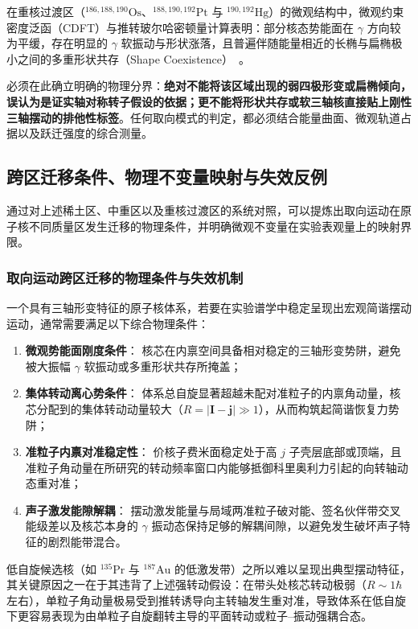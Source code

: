 在重核过渡区（$^{186,188,190}\mathrm{Os}$、$^{188,190,192}\mathrm{Pt}$ 与 $^{190,192}\mathrm{Hg}$）的微观结构中，微观约束密度泛函（CDFT）与推转玻尔哈密顿量计算表明：部分核态势能面在 $\gamma$ 方向较为平缓，存在明显的 $\gamma$ 软振动与形状涨落，且普遍伴随能量相近的长椭与扁椭极小之间的多重形状共存（Shape Coexistence）~\cite{prochniak-rohozinski-2009-bohr-collective-hamiltonian}。

必须在此确立明确的物理分界：\textbf{绝对不能将该区域出现的弱四极形变或扁椭倾向，误认为是证实轴对称转子假设的依据；更不能将形状共存或软三轴核直接贴上刚性三轴摆动的排他性标签}。任何取向模式的判定，都必须结合能量曲面、微观轨道占据以及跃迁强度的综合测量。

\subsection{跨区迁移条件、物理不变量映射与失效反例}\label{sec:4-4-5}

通过对上述稀土区、中重区以及重核过渡区的系统对照，可以提炼出取向运动在原子核不同质量区发生迁移的物理条件，并明确微观不变量在实验表观量上的映射界限。

\subsubsection{取向运动跨区迁移的物理条件与失效机制}

一个具有三轴形变特征的原子核体系，若要在实验谱学中稳定呈现出宏观简谐摆动运动，通常需要满足以下综合物理条件：
\begin{enumerate}
\item \textbf{微观势能面刚度条件}：
核芯在内禀空间具备相对稳定的三轴形变势阱，避免被大振幅 $\gamma$ 软振动或多重形状共存所掩盖；
\item \textbf{集体转动离心势条件}：
体系总自旋显著超越未配对准粒子的内禀角动量，核芯分配到的集体转动动量较大（$R = |\mathbf{I} - \mathbf{j}| \gg 1$），从而构筑起简谐恢复力势阱；
\item \textbf{准粒子内禀对准稳定性}：
价核子费米面稳定处于高 $j$ 子壳层底部或顶端，且准粒子角动量在所研究的转动频率窗口内能够抵御科里奥利力引起的向转轴动态重对准；
\item \textbf{声子激发能隙解耦}：
摆动激发能量与局域两准粒子破对能、签名伙伴带交叉能级差以及核芯本身的 $\gamma$ 振动态保持足够的解耦间隙，以避免发生破坏声子特征的剧烈能带混合。
\end{enumerate}

低自旋候选核（如 $^{135}\mathrm{Pr}$ 与 $^{187}\mathrm{Au}$ 的低激发带）之所以难以呈现出典型摆动特征，其关键原因之一在于其违背了上述强转动假设：在带头处核芯转动极弱（$R \sim 1\hbar$ 左右），单粒子角动量极易受到推转诱导向主转轴发生重对准，导致体系在低自旋下更容易表现为由单粒子自旋翻转主导的平面转动或粒子--振动强耦合态。

